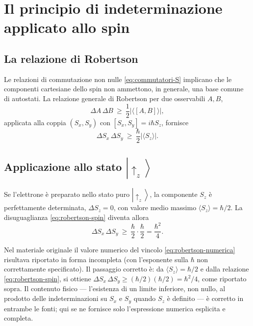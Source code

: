 \documentclass[11pt,a4paper]{article}
\newcommand{\ket}[1]{\left|#1\right\rangle}
\begin{document}
\section{Il principio di indeterminazione applicato allo spin}

\subsection{La relazione di Robertson}

Le relazioni di commutazione non nulle \eqref{eq:commutatori-S} implicano che le componenti cartesiane dello spin non ammettono, in generale, una base comune di autostati. La relazione generale di Robertson per due osservabili $A,B$,
\[
\Delta A\,\Delta B \ \ge\ \frac12\left|\langle[A,B]\rangle\right|,
\]
applicata alla coppia $(S_x,S_y)$ con $[S_x,S_y]=i\hbar S_z$, fornisce
\begin{equation}
\Delta S_x\,\Delta S_y \ \ge\ \frac{\hbar}{2}\left|\langle S_z\rangle\right|.
\label{eq:robertson-spin}
\end{equation}

\subsection{Applicazione allo stato \texorpdfstring{$\ket{\uparrow_z}$}{|up\_z>}}

Se l'elettrone è preparato nello stato puro $\ket{\uparrow_z}$, la componente $S_z$ è perfettamente determinata, $\Delta S_z=0$, con valore medio massimo $\langle S_z\rangle=\hbar/2$. La disuguaglianza \eqref{eq:robertson-spin} diventa allora
\begin{equation}
\Delta S_x\,\Delta S_y \ \ge\ \frac{\hbar}{2}\cdot\frac{\hbar}{2} = \frac{\hbar^2}{4}.
\label{eq:robertson-numerica}
\end{equation}

\begin{nota}
Nel materiale originale il valore numerico del vincolo \eqref{eq:robertson-numerica} risultava riportato in forma incompleta (con l'esponente sulla $\hbar$ non correttamente specificato). Il passaggio corretto è: da $\langle S_z\rangle=\hbar/2$ e dalla relazione \eqref{eq:robertson-spin}, si ottiene $\Delta S_x\,\Delta S_y \ge (\hbar/2)(\hbar/2)=\hbar^2/4$, come riportato sopra. Il contenuto fisico — l'esistenza di un limite inferiore, non nullo, al prodotto delle indeterminazioni su $S_x$ e $S_y$ quando $S_z$ è definito — è corretto in entrambe le fonti; qui se ne fornisce solo l'espressione numerica esplicita e completa.
\end{nota}
\end{document}
